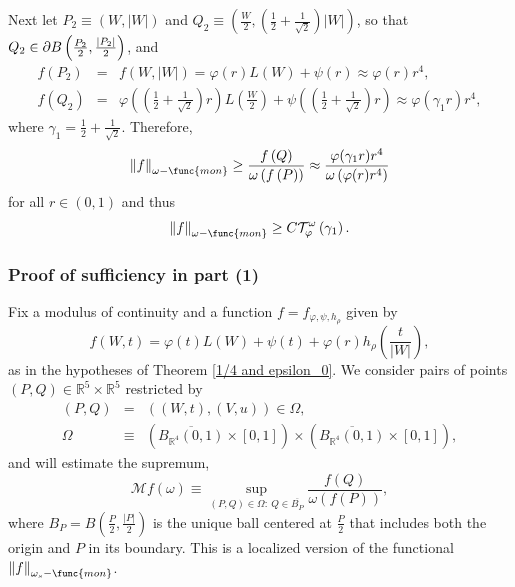 \documentclass{amsart}
\theoremstyle{plain}
\numberwithin{equation}{section}
\begin{document}
Next let $P_{2}\equiv \left( W,\left\vert W\right\vert \right) $ and $%
Q_{2}\equiv \left( \frac{W}{2},\left( \frac{1}{2}+\frac{1}{\sqrt{2}}\right)
\left\vert W\right\vert \right) $, so that $Q_{2}\in \partial B\left( \frac{%
P_{2}}{2},\frac{\left\vert P_{2}\right\vert }{2}\right) $, and 
\begin{eqnarray*}
f\left( P_{2}\right) &=&f\left( W,\left\vert W\right\vert \right) =\varphi
\left( r\right) L\left( W\right) +\psi \left( r\right) \approx \varphi
(r)r^{4}, \\
f\left( Q_{2}\right) &=&\varphi \left( \left( \frac{1}{2}+\frac{1}{\sqrt{2}}%
\right) r\right) L\left( \frac{W}{2}\right) +\psi \left( \left( \frac{1}{2}+%
\frac{1}{\sqrt{2}}\right) r\right) \approx \varphi (\gamma _{1}r)r^{4},
\end{eqnarray*}%
where $\gamma _{1}=\frac{1}{2}+\frac{1}{\sqrt{2}}$. Therefore, 
\begin{equation*}
\left\Vert f\right\Vert _{\omega -\func{mon}}\geq \frac{f\left( Q\right) }{%
\omega \left( f\left( P\right) \right) }\approx \frac{\varphi (\gamma
_{1}r)r^{4}}{\omega \left( \varphi (r)r^{4}\right) }
\end{equation*}%
for all $r\in (0,1)$ and thus 
\begin{equation*}
\left\Vert f\right\Vert _{\omega -\func{mon}}\geq C\mathcal{T}_{\varphi
}^{\omega }\left( \gamma _{1}\right) .
\end{equation*}

\subsubsection{Proof of sufficiency in part (1)}

Fix a modulus of continuity and a function $f=f_{\varphi ,\psi ,h_{\rho }}$
given by 
\begin{equation*}
f\left( W,t\right) =\varphi \left( t\right) L\left( W\right) +\psi \left(
t\right) +\varphi \left( r\right) h_{\rho }\left( \frac{t}{\left\vert
W\right\vert }\right) ,
\end{equation*}%
as in the hypotheses of Theorem \ref{1/4 and epsilon_0}. We consider pairs
of points $\left( P,Q\right) \in \mathbb{R}^{5}\times \mathbb{R}^{5}$
restricted by 
\begin{eqnarray*}
\left( P,Q\right) &=&\left( \left( W,t\right) ,\left( V,u\right) \right) \in
\Omega , \\
\Omega &\equiv &\left( \overline{B_{\mathbb{R}^{4}}\left( 0,1\right) }\times %
\left[ 0,1\right] \right) \times \left( \overline{B_{\mathbb{R}^{4}}\left(
0,1\right) }\times \left[ 0,1\right] \right) ,
\end{eqnarray*}%
and will estimate the supremum,%
\begin{equation*}
\mathcal{M}f\left( \omega \right) \equiv \sup_{\left( P,Q\right) \in \Omega
:\ Q\in \overline{B_{P}}}\frac{f\left( Q\right) }{\omega \left( f\left(
P\right) \right) },
\end{equation*}%
where $B_{P}=B\left( \frac{P}{2},\frac{\left\vert P\right\vert }{2}\right) $
is the unique ball centered at $\frac{P}{2}$ that includes both the origin
and $P$ in its boundary. This is a localized version of the functional $%
\left\Vert f\right\Vert _{\omega _{s}-\func{mon}}$.
\end{document}

